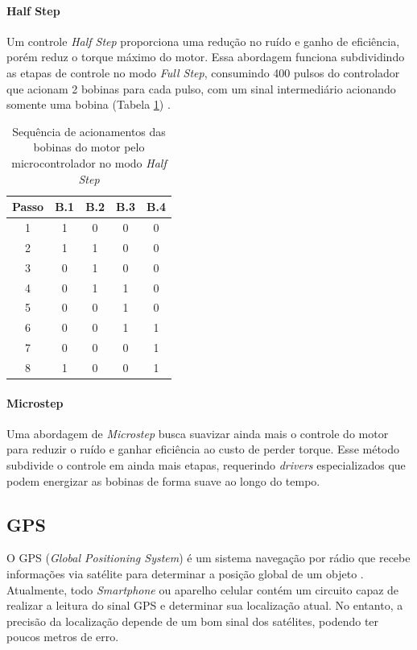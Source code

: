 \paragraph{Half Step}
Um controle \textit{Half Step} proporciona uma redução no ruído e ganho de eficiência, porém reduz o torque máximo do motor. Essa abordagem funciona subdividindo as etapas de controle no modo \textit{Full Step}, consumindo 400 pulsos do controlador que acionam 2 bobinas para cada pulso, com um sinal intermediário acionando somente uma bobina (Tabela \ref{tab:hs}) \cite{man:advancedmicrosystemStepControl}.

\begin{table}[!htb]
	\centering	
	\caption{Sequência de acionamentos das bobinas do motor pelo microcontrolador no modo \textit{Half Step}}
	\begin{tabular}{c|c|c|c|c}
				Passo & B.1 & B.2 & B.3 & B.4 \\\hline
		1	& 1 & 0 & 0 & 0\\
		2	& 1 & 1 & 0 & 0\\
		3	& 0 & 1 & 0 & 0\\
		4	& 0 & 1	& 1 & 0\\
		5	& 0 & 0 & 1 & 0\\
		6	& 0 & 0 & 1 & 1\\
		7	& 0 & 0 & 0 & 1\\
		8	& 1 & 0	& 0 & 1\\
	\end{tabular}
	\label{tab:hs}
	\fonte{}
\end{table}

\paragraph{Microstep}
Uma abordagem de \textit{Microstep} busca suavizar ainda mais o controle do motor para reduzir o ruído e ganhar eficiência ao custo de perder torque. Esse método subdivide o controle em ainda mais etapas, requerindo \textit{drivers} especializados que podem energizar as bobinas de forma suave ao longo do tempo. 

\subsection{GPS}
O GPS (\textit{Global Positioning System}) é um sistema navegação por rádio que recebe informações via satélite para determinar a posição global de um objeto \cite{apostilagps}. Atualmente, todo \textit{Smartphone} ou aparelho celular contém um circuito capaz de realizar a leitura do sinal GPS e determinar sua localização atual. No entanto, a precisão da localização depende de um bom sinal dos satélites, podendo ter poucos metros de erro.

